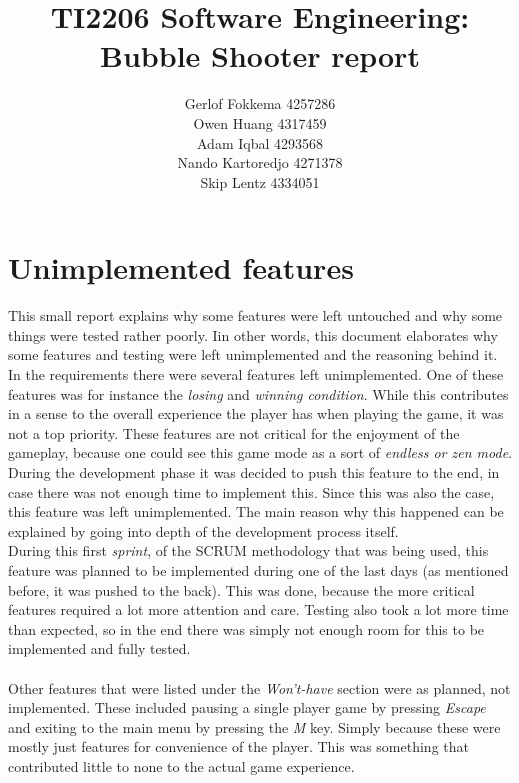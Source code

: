 \documentclass[a4paper,11pt]{article}
\title{TI2206 Software Engineering: Bubble Shooter report}
\author{Gerlof Fokkema 4257286 \\
	Owen Huang 4317459 \\
	Adam Iqbal 4293568 \\
	Nando Kartoredjo 4271378 \\
	Skip Lentz 4334051 \\
}
\begin{document}
\maketitle

\newpage
\section*{Unimplemented features}
This small report explains why some features were left untouched and why some things were tested rather poorly. Iin other words, this document elaborates why some features and testing were left unimplemented and the reasoning behind it. \\
\noindent
In the requirements there were several features left unimplemented. One of these features was for instance the \textit{losing} and \textit{winning condition}.
While this contributes in a sense to the overall experience the player has when playing the game, it was not a top priority. These features are not critical for the enjoyment of the gameplay, because one could see this game mode as a sort of \textit{endless or zen mode}. During the development phase it was decided to push this feature to the end, in case there was not enough time to implement this. Since this was also the case, this feature was left unimplemented. The main reason why this happened can be explained by going into depth of the development process itself. \\
\indent During this first \textit{sprint}, of the SCRUM methodology that was being used, this feature was planned to be implemented during one of the last days (as mentioned before, it was pushed to the back). This was done, because the more critical features required a lot more attention and care. Testing also took a lot more time than expected, so in the end there was simply not enough room for this to be implemented and fully tested. \\\\
\noindent
Other features that were listed under the \textit{Won't-have} section were as planned, not implemented. These included pausing a single player game by pressing \textit{Escape} and exiting to the main menu by pressing the \textit{M} key.  Simply because these were mostly just features for convenience of the player. This was something that contributed little to none to the actual game experience.
\end{document}
